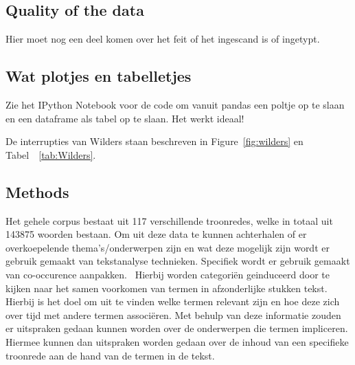 \subsection{Quality of the data}
Hier moet nog een deel komen over het feit of het ingescand is of ingetypt.

\pagebreak
\subsection{Wat plotjes en tabelletjes}

Zie het IPython Notebook voor de code om vanuit pandas een poltje op te slaan en een dataframe als tabel op te slaan. Het werkt ideaal! 

De interrupties van Wilders staan beschreven in Figure~\ref{fig:wilders} en Tabel~~\ref{tab:Wilders}.





\pagebreak

%


\pagebreak
\subsection{Methods}
Het gehele corpus bestaat uit 117 verschillende troonredes, welke in totaal uit 143875 woorden bestaan. 
Om uit deze data te kunnen achterhalen of er overkoepelende thema's/onderwerpen zijn en wat deze mogelijk zijn wordt er gebruik gemaakt van tekstanalyse technieken. Specifiek wordt er gebruik gemaakt van co-occurence aanpakken.~\cite{callon1991co} Hierbij worden categoriën geinduceerd door te kijken naar het samen voorkomen van termen in afzonderlijke stukken tekst.
 Hierbij is het doel om uit te vinden welke termen relevant zijn en hoe deze zich over tijd met andere termen associëren. Met behulp van deze informatie zouden er uitspraken gedaan kunnen worden over de onderwerpen die termen impliceren. Hiermee kunnen dan uitspraken worden gedaan over de inhoud van een specifieke troonrede aan de hand van de termen in de tekst. 

